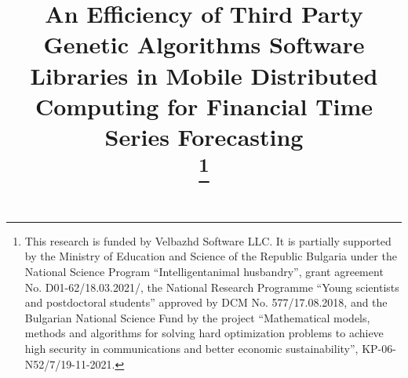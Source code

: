 \documentclass[conference]{IEEEtran}
\begin{document}


\title{An Efficiency of Third Party Genetic Algorithms Software Libraries in Mobile Distributed Computing for Financial Time Series Forecasting\\
{\footnotesize \textsuperscript{}}
\thanks{This research is funded by Velbazhd Software LLC. It is partially supported by the Ministry of Education and Science of the Republic Bulgaria under the National Science Program “Intelligentanimal husbandry”, grant agreement No. D01-62/18.03.2021/, the National Research Programme “Young scientists and postdoctoral students” approved by DCM No. 577/17.08.2018, and the Bulgarian National Science Fund by the project “Mathematical models, methods and algorithms for solving hard optimization problems to achieve high security in communications and better economic sustainability”, KP-06-N52/7/19-11-2021.}
}

\author{
\and
{}
\and
{}
\and
{}
\and
{}
}
\end{document}
